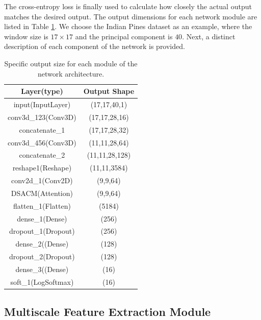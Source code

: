 \documentclass[]{interact}
\theoremstyle{plain}%
\theoremstyle{definition}
\theoremstyle{remark}
\begin{document}
The cross-entropy loss is finally used to calculate how closely the actual output matches the desired output. The output dimensions for each network module are listed in Table \ref{tab:1}. We choose the Indian Pines dataset as an example, where the window size is $17\times17$ and the principal component is $40$. Next, a distinct description of each component of the network is provided.
\begin{table}[!h]
\small
\setlength{\belowcaptionskip}{0.5cm}
\setlength{\abovecaptionskip}{0cm}
\caption{Specific output size for each module of the network architecture.}
\renewcommand{\arraystretch}{1.2}
\begin{center}
\begin{tabular}{cc}
\hline
Layer(type) & Output Shape  \\
 \hline
 input(InputLayer) & (17,17,40,1)\\
  conv3d\_123(Conv3D) & (17,17,28,16)\\
  concatenate\_1 & (17,17,28,32)\\
  conv3d\_456(Conv3D) & (11,11,28,64)\\
  concatenate\_2 & (11,11,28,128)\\
  reshape1(Reshape) & (11,11,3584)\\
  conv2d\_1(Conv2D) & (9,9,64)\\
  DSACM(Attention) & (9,9,64)\\
  flatten\_1(Flatten) & (5184)\\
  dense\_1(Dense) & (256)\\
  dropout\_1(Dropout) & (256)\\
  dense\_2((Dense) & (128)\\
  dropout\_2(Dropout) & (128)\\
  dense\_3((Dense) & (16)\\
  soft\_1(LogSoftmax) & (16)\\
\hline
\end{tabular}
\label{tab:1}
\end{center}
\end{table}

\subsection{Multiscale Feature Extraction Module}
\end{document}
